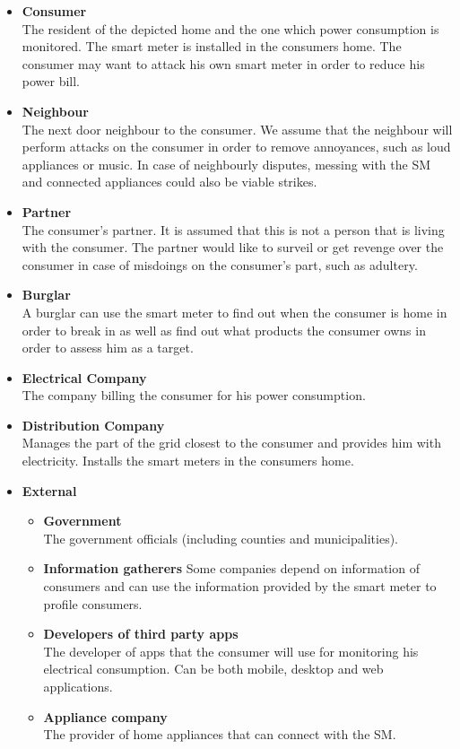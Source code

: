 \begin{itemize}
\item \textbf{Consumer}\\
The resident of the depicted home and the one which power consumption is monitored.
The smart meter is installed in the consumers home.
The consumer may want to attack his own smart meter in order to reduce his power bill.
\item \textbf{Neighbour}\\
The next door neighbour to the consumer.
We assume that the neighbour will perform attacks on the consumer in order to remove annoyances, such as loud appliances or music.
In case of neighbourly disputes, messing with the SM and connected appliances could also be viable strikes.
\item \textbf{Partner}\\
The consumer's partner.
It is assumed that this is not a person that is living with the consumer.
The partner would like to surveil or get revenge over the consumer in case of misdoings on the consumer's part, such as adultery.
\item \textbf{Burglar}\\ A burglar can use the smart meter to find out when the consumer is home in order to break in as well as find out what products the consumer owns in order to assess him as a target.
\item \textbf{Electrical Company}\\
The company billing the consumer for his power consumption.
\item \textbf{Distribution Company}\\
Manages the part of the grid closest to the consumer and provides him with electricity.
Installs the smart meters in the consumers home.
\item \textbf{External}
\begin{itemize}
  \item \textbf{Government}\\
The government officials (including counties and municipalities).
\item \textbf{Information gatherers} Some companies depend on information of consumers and can use the information provided by the smart meter to profile consumers.
\item \textbf{Developers of third party apps}\\
The developer of apps that the consumer will use for monitoring his electrical consumption. Can be both mobile, desktop and web applications.
\item \textbf{Appliance company}\\ The provider of home appliances that can connect with the SM.

\end{itemize}
\end{itemize}
